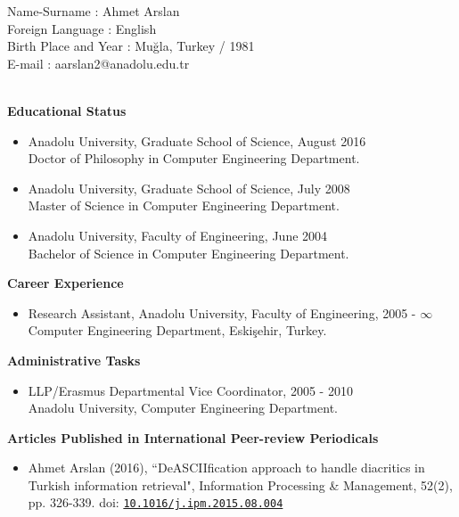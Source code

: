 \vspace*{0.8cm}
\noindent 
Name-Surname \phantom{iiooooo} : Ahmet Arslan\\
Foreign Language \phantom{oooo} : English\\
Birth Place and Year \phantom{o} : Mu\u{g}la, Turkey / 1981 \\
E-mail \phantom{iioooooooooooo} : aarslan2@anadolu.edu.tr

\hfil\\
\textbf{Educational Status}
\begin{itemize}
	\item Anadolu University, Graduate School of Science, \hfill August 2016 \\Doctor of Philosophy in Computer Engineering Department.
	\item Anadolu University, Graduate School of Science, \hfill July 2008 \\Master of Science in Computer Engineering Department.
	\item Anadolu University, Faculty of Engineering, \hfill June 2004 \\Bachelor of Science in Computer Engineering Department.
\end{itemize}

\noindent 
\textbf{Career Experience}
\begin{itemize}
	\item Research Assistant, Anadolu University, Faculty of Engineering, \hfill  2005 - $\infty$ \\Computer Engineering Department, Eski\c{s}ehir, Turkey.
\end{itemize}

\noindent 
\textbf{Administrative Tasks}
\begin{itemize}
	\item LLP/Erasmus Departmental Vice Coordinator, \hfill  2005 - 2010 \\ Anadolu University, Computer Engineering Department.
\end{itemize}

\noindent 
\textbf{Articles Published in International Peer-review Periodicals}
\begin{itemize}
    \item Ahmet Arslan (2016), ``DeASCIIfication approach to handle diacritics in Turkish information retrieval", Information Processing \& Management, 52(2), pp. 326-339. doi: \href{http://dx.doi.org/10.1016/j.ipm.2015.08.004}{\texttt{10.1016/j.ipm.2015.08.004}}
\end{itemize}

